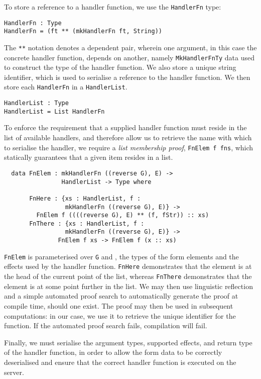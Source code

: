 \documentclass[preprint]{sigplanconf}
\begin{document}
To store a reference to a handler function, we use the \texttt{HandlerFn} type:
{\small
\begin{verbatim}
HandlerFn : Type
HandlerFn = (ft ** (mkHandlerFn ft, String))
\end{verbatim}
}
%
The \texttt{**} notation denotes a dependent pair, wherein one argument, in this case the concrete handler function, depends on another, namely \texttt{MkHandlerFnTy} data used to construct the type of the handler function. We also store a unique string identifier, which is used to serialise a reference to the handler function. We then store each \texttt{HandlerFn} in a \texttt{HandlerList}.

\begin{verbatim}
HandlerList : Type
HandlerList = List HandlerFn
\end{verbatim}
To enforce the requirement that a supplied handler function must reside in the list of available handlers, and therefore allow us to retrieve the name with which to serialise the handler, we require a \textit{list membership proof},  \texttt{FnElem f fns}, which statically guarantees that a given item resides in a list.
{\small
\begin{verbatim}
  data FnElem : mkHandlerFn ((reverse G), E) -> 
                HandlerList -> Type where
                
       FnHere : {xs : HandlerList, f : 
                 mkHandlerFn ((reverse G), E)} ->
         FnElem f ((((reverse G), E) ** (f, fStr)) :: xs)
       FnThere : {xs : HandlerList, f : 
                 mkHandlerFn ((reverse G), E)} ->
               FnElem f xs -> FnElem f (x :: xs)
\end{verbatim}
}
\texttt{FnElem} is parameterised over \texttt{G} and , the types of the form elements and the effects used by the handler function. \texttt{FnHere} demonstrates that the element is at the head of the current point of the list, whereas \texttt{FnThere} demonstrates that the element is at some point further in the list. %
We may then use linguistic reflection and a simple automated proof search to automatically generate the proof at compile time, should one exist. The proof may then be used in subsequent computations: in our case, we use it to retrieve the unique identifier for the function. If the automated proof search fails, compilation will fail.

Finally, we must serialise the argument types, supported effects, and return type of the handler function, in order to allow the form data to be correctly deserialised and ensure that the correct handler function is executed on the server. 
\end{document}
